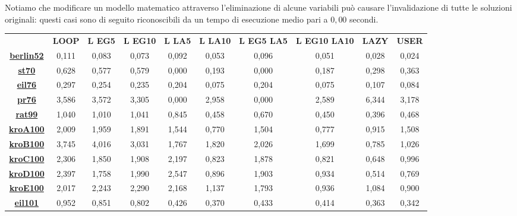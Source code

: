 \documentclass[11pt]{article}
\begin{document}
Notiamo che modificare un modello matematico attraverso l'eliminazione di alcune variabili può causare l'invalidazione di tutte le soluzioni originali: questi casi sono di seguito riconoscibili da un tempo di esecuzione medio pari a $0,00$ secondi.

\newpage

\begin{table}
\begin{adjustbox}{center}
\begin{tabular}{|c|c|c|c|c|c|c|c|c|c|}
    \cline{2-10} 
        \multicolumn{1}{c|}{} & \multirow{3}{*}{\textbf{LOOP}} & \multirow{3}{*}{\textbf{L EG5}} & \multirow{3}{*}{\textbf{L EG10}} & \multirow{3}{*}{\textbf{L LA5}} & \multirow{3}{*}{\textbf{L LA10}} & \multirow{3}{*}{\textbf{L EG5 LA5}} & \multirow{3}{*}{\textbf{L EG10 LA10}} & \multirow{3}{*}{\textbf{LAZY}} & \multirow{3}{*}{\textbf{USER}}\tabularnewline
        \multicolumn{1}{c|}{} &  &  &  &  &  &  &  &  & \tabularnewline
        \multicolumn{1}{c|}{} &  &  &  &  &  &  &  &  & \tabularnewline
        \hline 
        \textbf{\hyperref[fig:berlin52]{berlin52}} & 0,111 & 0,083 & 0,073 & 0,092 & 0,053 & 0,096 & 0,051 & 0,028 & 0,024\tabularnewline
        \hline 
        \textbf{\hyperref[fig:st70]{st70}} & 0,628 & 0,577 & 0,579 & 0,000 & 0,193 & 0,000 & 0,187 & 0,298 & 0,363\tabularnewline
        \hline 
        \textbf{\hyperref[fig:eil76]{eil76}} & 0,297 & 0,254 & 0,235 & 0,204 & 0,075 & 0,204 & 0,075 & 0,107 & 0,084\tabularnewline
        \hline 
        \textbf{\hyperref[fig:pr76]{pr76}} & 3,586 & 3,572 & 3,305 & 0,000 & 2,958 & 0,000 & 2,589 & 6,344 & 3,178\tabularnewline
        \hline 
        \textbf{\hyperref[fig:rat99]{rat99}} & 1,040 & 1,010 & 1,041 & 0,845 & 0,458 & 0,670 & 0,450 & 0,396 & 0,468\tabularnewline
        \hline 
        \textbf{\hyperref[fig:kroA100]{kroA100}} & 2,009 & 1,959 & 1,891 & 1,544 & 0,770 & 1,504 & 0,777 & 0,915 & 1,508\tabularnewline
        \hline 
        \textbf{\hyperref[fig:kroB100]{kroB100}} & 3,745 & 4,016 & 3,031 & 1,767 & 1,820 & 2,026 & 1,699 & 0,785 & 1,026\tabularnewline
        \hline 
        \textbf{\hyperref[fig:kroC100]{kroC100}} & 2,306 & 1,850 & 1,908 & 2,197 & 0,823 & 1,878 & 0,821 & 0,648 & 0,996\tabularnewline
        \hline 
        \textbf{\hyperref[fig:kroD100]{kroD100}} & 2,397 & 1,758 & 1,990 & 2,547 & 0,896 & 1,903 & 0,934 & 0,514 & 0,769\tabularnewline
        \hline 
        \textbf{\hyperref[fig:kroE100]{kroE100}} & 2,017 & 2,243 & 2,290 & 2,168 & 1,137 & 1,793 & 0,936 & 1,084 & 0,900\tabularnewline
        \hline 
        \textbf{\hyperref[fig:eil101]{eil101}} & 0,952 & 0,851 & 0,802 & 0,426 & 0,370 & 0,433 & 0,414 & 0,363 & 0,342\tabularnewline

\end{tabular}
\end{adjustbox}
\end{table}
\end{document}
